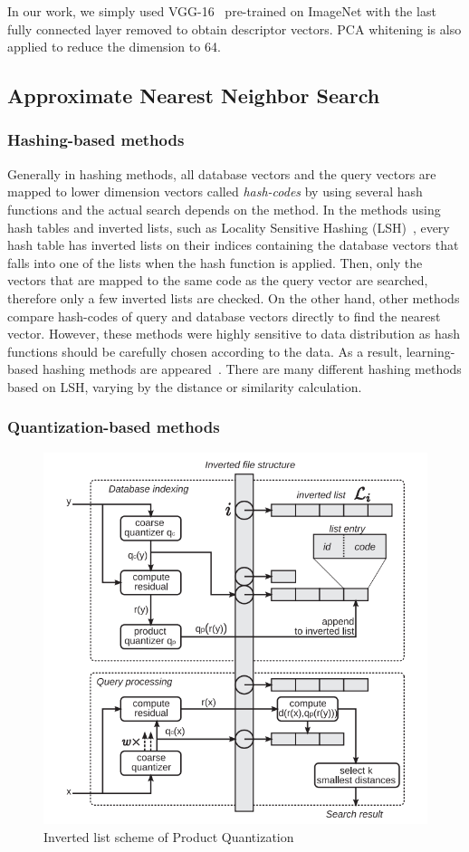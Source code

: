 In our work, we simply used VGG-16~\cite{simonyan2014very} pre-trained on ImageNet with the last fully connected layer removed to obtain descriptor vectors. PCA whitening is also applied to reduce the dimension to 64.

\subsection{Approximate Nearest Neighbor Search}

\subsubsection*{Hashing-based methods}

Generally in hashing methods, all database vectors and the query vectors are mapped to lower dimension vectors called \emph{hash-codes} by using several hash functions and the actual search depends on the method. 
In the methods using hash tables and inverted lists, such as Locality Sensitive Hashing (LSH)~\cite{indyk1998approximate}, every hash table has inverted lists on their indices containing the database vectors that falls into one of the lists when the hash function is applied.
Then, only the vectors that are mapped to the same code as the query vector are searched, therefore only a few inverted lists are checked.
On the other hand, other methods compare hash-codes of query and database vectors directly to find the nearest vector.
However, these methods were highly sensitive to data distribution as hash functions should be carefully chosen according to the data. 
As a result, learning-based hashing methods are appeared~\cite{weiss2009spectral}\cite{liu2012supervised}.
There are many different hashing methods based on LSH, varying by the distance or similarity calculation.

\subsubsection*{Quantization-based methods}
\label{subsec:related-quantization}

\begin{figure}
    \centering
    \includegraphics[width=.6\textwidth]{thesis/images/pq-fig.png}
    \caption{Inverted list scheme of Product Quantization\cite{jegou2010product}}
    \label{fig:pq}
\end{figure}


